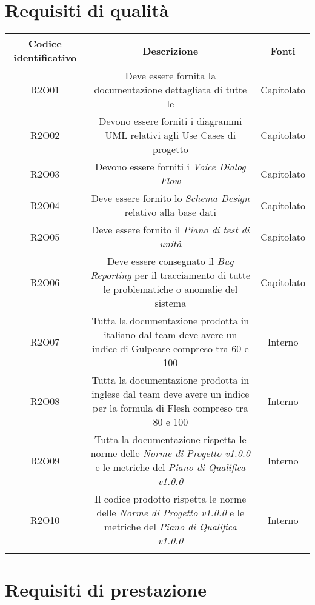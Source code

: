 \section{Requisiti di qualità}
\begin{tabularx}{\textwidth}{|C|C|C|}
	\hline
	\textbf{Codice identificativo} & \textbf{Descrizione} & \textbf{Fonti} \\
	\hline
	\endhead
	R2O01 & Deve essere fornita la documentazione dettagliata di tutte le  & Capitolato\\
	\hline
	R2O02 & Devono essere forniti i diagrammi UML relativi agli Use Cases di progetto  & Capitolato\\
	\hline
	R2O03 & Devono essere forniti i \textit{Voice Dialog Flow} & Capitolato\\
	\hline
	R2O04 & Deve essere fornito lo \textit{Schema Design} relativo alla base dati  & Capitolato\\
	\hline
	R2O05 & Deve essere fornito il \textit{Piano di test di unità} & Capitolato\\
	\hline
	R2O06 & Deve essere consegnato il \textit{Bug Reporting} per il tracciamento di
	tutte le problematiche o anomalie del sistema & Capitolato\\
	\hline
	R2O07 & Tutta la documentazione prodotta in italiano dal team deve avere
	un indice di Gulpease compreso tra 60 e 100 & Interno\\
	\hline
	R2O08 & Tutta la documentazione prodotta in inglese dal team deve avere
	un indice per la formula di Flesh compreso tra 80 e 100 & Interno\\
	\hline
	R2O09 & Tutta la documentazione rispetta le norme delle \textit{Norme di Progetto v1.0.0} e le metriche del \textit{Piano di Qualifica v1.0.0}& Interno\\
	\hline
	R2O10 & Il codice prodotto rispetta le norme delle \textit{Norme di Progetto v1.0.0} e le metriche del \textit{Piano di Qualifica v1.0.0}& Interno\\
	\hline
    \caption{Tabella requisiti di qualità}
\end{tabularx}

\section{Requisiti di prestazione}

